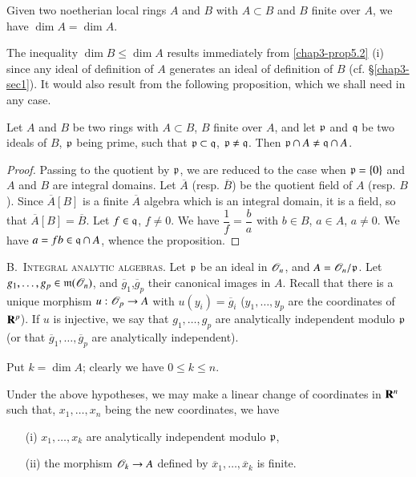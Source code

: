 \begin{theorem}\label{chap3-thm5.3}
Given two noetherian local rings $A$ and $B$ with $A\subset B$ and $B$ finite over $A$, we have $\dim A=\dim A$.
\end{theorem}

The inequality $\dim B\leq \dim A$ results immediately from \ref{chap3-prop5.2} (i) since any ideal of definition of $A$ generates an ideal of definition of $B$ (cf. \S\ref{chap3-sec1}). It would also result from the following proposition, which we shall need in any case.

\begin{proposition}\label{chap3-prop5.4}
Let $A$ and $B$ be two rings with $A\subset B$, $B$ finite over $A$, and let $\mathfrak{p}$ and $\mathfrak{q}$ be two ideals of $B$, $\mathfrak{p}$ being prime, such that $\mathfrak{p}\subset\mathfrak{q}$, $\mathfrak{p}\neq \mathfrak{q}$. Then $\mathfrak{p}\cap A\neq \mathfrak{q}\cap A$.
\end{proposition}

\begin{proof}
Passing to the quotient by $\mathfrak{p}$, we are reduced to the case when $\mathfrak{p}=\{0\}$ and $A$ and $B$ are integral domains. Let $\overline{A}$ (resp. $\overline{B}$) be the quotient field of $A$ (resp. $B$). Since $\overline{A}[B]$ is a finite $\overline{A}$ algebra which is an integral domain, it is a field, so that $\overline{A}[B]=\overline{B}$. Let $f\in \mathfrak{q}$, $f\neq 0$. We have $\dfrac{1}{f}=\dfrac{b}{a}$ with $b\in B$, $a\in A$, $a\neq 0$. We have $a=fb\in \mathfrak{q}\cap A$, whence the proposition.
\end{proof}

B.~\textsc{Integral analytic algebras.} Let $\mathfrak{p}$ be an ideal in $\mathscr{O}_{n}$, and $A=\mathscr{O}_{n}/\mathfrak{p}$. Let $g_{1},\ldots,g_{p}\in \mathfrak{m}(\mathscr{O}_{n})$, and $\overline{g}_{1}$,\quad $\overline{g}_{p}$ their canonical images in $A$. Recall that there is a unique morphism $u:\mathscr{O}_{p}\to A$ with $u(y_{i})=\overline{g}_{i}$ ($y_{1},\ldots,y_{p}$ are the coordinates of $\mathbf{R}^{p}$). If $u$ is injective, we say that $g_{1},\ldots,g_{p}$ are analytically independent modulo $\mathfrak{p}$ (or that $\overline{g}_{1},\ldots,\overline{g}_{p}$ are analytically independent).

Put $k=\dim A$; clearly we have $0\leq k\leq n$.

\begin{theorem}\label{chap3-thm5.5}
Under the above hypotheses, we may make a linear change of coordinates in $\mathbf{R}^{n}$ such that, $x_{1},\ldots,x_{n}$ being the new coordinates, we have
\begin{itemize}
\item[\rm(i)] $x_{1},\ldots,x_{k}$ are analytically independent modulo $\mathfrak{p}$,

\item[\rm(ii)] the morphism $\mathscr{O}_{k}\to A$ defined by $\overline{x}_{1},\ldots,\overline{x}_{k}$ is finite.
\end{itemize}
\end{theorem}

